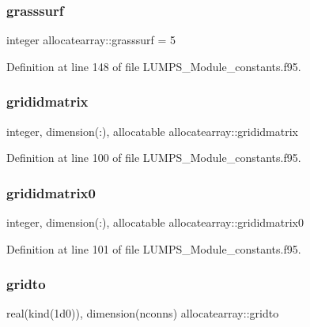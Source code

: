 \subsubsection{\texorpdfstring{grasssurf}{grasssurf}}
{\footnotesize\ttfamily integer allocatearray\+::grasssurf = 5}



Definition at line 148 of file L\+U\+M\+P\+S\+\_\+\+Module\+\_\+constants.\+f95.

\mbox{\label{namespaceallocatearray_aaa33b997b1acf75030be64062214ccca}} 
\subsubsection{\texorpdfstring{grididmatrix}{grididmatrix}}
{\footnotesize\ttfamily integer, dimension(\+:), allocatable allocatearray\+::grididmatrix}



Definition at line 100 of file L\+U\+M\+P\+S\+\_\+\+Module\+\_\+constants.\+f95.

\mbox{\label{namespaceallocatearray_a603f404abac892ea63b945352623553e}} 
\subsubsection{\texorpdfstring{grididmatrix0}{grididmatrix0}}
{\footnotesize\ttfamily integer, dimension(\+:), allocatable allocatearray\+::grididmatrix0}



Definition at line 101 of file L\+U\+M\+P\+S\+\_\+\+Module\+\_\+constants.\+f95.

\mbox{\label{namespaceallocatearray_a48e0ebcd7ec31deaddaf32352c02e180}} 
\subsubsection{\texorpdfstring{gridto}{gridto}}
{\footnotesize\ttfamily real(kind(1d0)), dimension(nconns) allocatearray\+::gridto}



